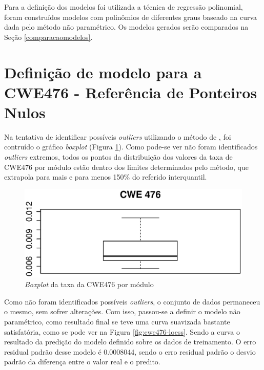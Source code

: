Para a definição dos modelos foi utilizada a técnica de regressão polinomial,
foram construídos modelos com polinômios de diferentes graus baseado na curva
dada pelo método não paramétrico. Os modelos gerados serão comparados na Seção
\ref{comparacaomodelos}.

\section{Definição de modelo para a CWE476 - Referência de Ponteiros Nulos}

Na tentativa de identificar possíveis \textit{outliers} utilizando o método de
, foi contruído o gráfico \textit{boxplot} (Figura
\ref{fig:cwe476-boxplot}). Como pode-se ver não foram identificados
\textit{outliers} extremos, todos os pontos da distribuição dos valores da taxa
de CWE476 por módulo estão dentro dos limites determinados pelo método, que
extrapola para mais e para menos 150\% do referido interquantil.

\begin{figure}[h]
  \centering
  \includegraphics[width=1.0\textwidth]
      {figuras/cwe476-boxplot.eps}
      \caption{\textit{Boxplot} da taxa da CWE476 por módulo}
  \label{fig:cwe476-boxplot}
\end{figure}

Como não foram identificados possíveis \textit{outliers}, o conjunto de dados
permaneceu o mesmo, sem sofrer alterações. Com isso, passou-se a definir o
modelo não paramétrico, como resultado final se teve uma curva suavizada
bastante satisfatória, como se pode ver na Figura \ref{fig:cwe476-loess}. Sendo
a curva o resultado da predição do modelo definido sobre os dados de
treinamento. O erro residual padrão desse modelo é 0.0008044, sendo o erro
residual padrão o desvio padrão da diferença entre o valor real e o predito.

